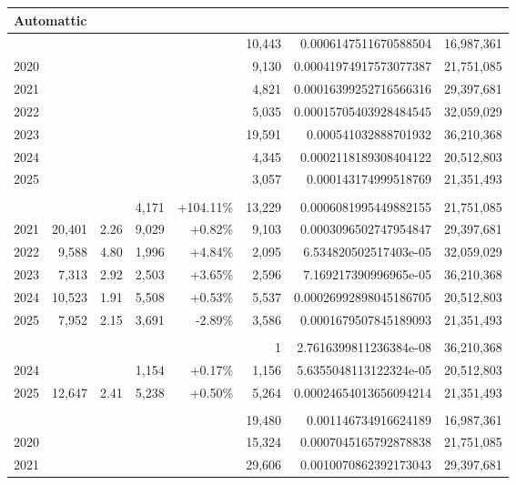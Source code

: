 \begin{table}[!t]
\begin{tabular*}{\linewidth}{@{\extracolsep{\fill}}l|rrrrrrr}
\multicolumn{8}{l}{Automattic} \\[2.5pt] 
\midrule\addlinespace[2.5pt]
2019 &  &  &  &  & 10,443 & 0.0006147511670588504 & 16,987,361 \\
2020 &  &  &  &  & 9,130 & 0.00041974917573077387 & 21,751,085 \\
2021 &  &  &  &  & 4,821 & 0.00016399252716566316 & 29,397,681 \\
2022 &  &  &  &  & 5,035 & 0.00015705403928484545 & 32,059,029 \\
2023 &  &  &  &  & 19,591 & 0.000541032888701932 & 36,210,368 \\
2024 &  &  &  &  & 4,345 & 0.0002118189308404122 & 20,512,803 \\
2025 &  &  &  &  & 3,057 & 0.000143174999518769 & 21,351,493 \\
\midrule\addlinespace[2.5pt]
\multicolumn{8}{l}{Aylo} \\[2.5pt] 
\midrule\addlinespace[2.5pt]
2020 &  &  & 4,171 & +104.11\% & 13,229 & 0.0006081995449882155 & 21,751,085 \\
2021 & 20,401 & 2.26 & 9,029 & +0.82\% & 9,103 & 0.0003096502747954847 & 29,397,681 \\
2022 & 9,588 & 4.80 & 1,996 & +4.84\% & 2,095 & 6.534820502517403e-05 & 32,059,029 \\
2023 & 7,313 & 2.92 & 2,503 & +3.65\% & 2,596 & 7.169217390996965e-05 & 36,210,368 \\
2024 & 10,523 & 1.91 & 5,508 & +0.53\% & 5,537 & 0.00026992898045186705 & 20,512,803 \\
2025 & 7,952 & 2.15 & 3,691 & -2.89\% & 3,586 & 0.0001679507845189093 & 21,351,493 \\
\midrule\addlinespace[2.5pt]
\multicolumn{8}{l}{Bluesky} \\[2.5pt] 
\midrule\addlinespace[2.5pt]
2023 &  &  &  &  & 1 & 2.7616399811236384e-08 & 36,210,368 \\
2024 &  &  & 1,154 & +0.17\% & 1,156 & 5.6355048113122324e-05 & 20,512,803 \\
2025 & 12,647 & 2.41 & 5,238 & +0.50\% & 5,264 & 0.00024654013656094214 & 21,351,493 \\
\midrule\addlinespace[2.5pt]
\multicolumn{8}{l}{Discord} \\[2.5pt] 
\midrule\addlinespace[2.5pt]
2019 &  &  &  &  & 19,480 & 0.001146734916624189 & 16,987,361 \\
2020 &  &  &  &  & 15,324 & 0.0007045165792878838 & 21,751,085 \\
2021 &  &  &  &  & 29,606 & 0.0010070862392173043 & 29,397,681 \\

\end{tabular*}
\end{table}

